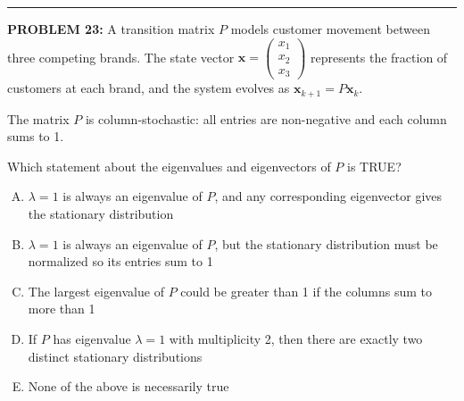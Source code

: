 \documentclass[12pt]{amsart}
\newcommand{\divider}{
  \vspace{-1em} %
  \noindent
  \raisebox{-0.15ex}{\textbullet}%
  \hspace{0.5em}%
  \rule[0.5ex]{0.95\textwidth}{1.0pt}%
  \hspace{0.5em}%
  \raisebox{-0.15ex}{\textbullet}%
  \vspace{0em} %
}
\begin{document}
{\divider

\newpage


{\bf PROBLEM 23:}
% 
A transition matrix $P$ models customer movement between three competing brands. The state vector $\mathbf{x} = \begin{pmatrix} x_1 \\ x_2 \\ x_3 \end{pmatrix}$ represents the fraction of customers at each brand, and the system evolves as $\mathbf{x}_{k+1} = P\mathbf{x}_k$.

The matrix $P$ is column-stochastic: all entries are non-negative and each column sums to 1.

Which statement about the eigenvalues and eigenvectors of $P$ is TRUE?

\begin{enumerate}[(A)]
\item $\lambda = 1$ is always an eigenvalue of $P$, and any corresponding eigenvector gives the stationary distribution
\item $\lambda = 1$ is always an eigenvalue of $P$, but the stationary distribution must be normalized so its entries sum to 1
\item The largest eigenvalue of $P$ could be greater than 1 if the columns sum to more than 1
\item If $P$ has eigenvalue $\lambda = 1$ with multiplicity 2, then there are exactly two distinct stationary distributions
\item None of the above is necessarily true
\end{enumerate}


}
\end{document}
